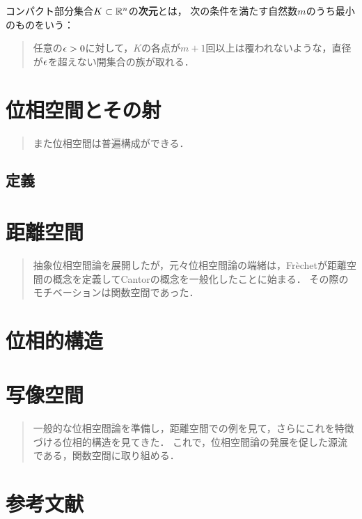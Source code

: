 \documentclass[uplatex,dvipdfmx]{jsreport}
\begin{document}
\begin{definition}
    コンパクト部分集合$K\subset\mathbb{R}^n$の\textbf{次元}とは，
    次の条件を満たす自然数$m$のうち最小のものをいう：
    \begin{quote}
        任意の$\epsilon>0$に対して，$K$の各点が$m+1$回以上は覆われないような，直径が$\epsilon$を超えない開集合の族が取れる．
    \end{quote}
\end{definition}

\chapter{位相空間とその射}

\begin{quotation}
    また位相空間は普遍構成ができる．
\end{quotation}

\section{定義}

\chapter{距離空間}

\begin{quotation}
    抽象位相空間論を展開したが，元々位相空間論の端緒は，Fr\`{e}chetが距離空間の概念を定義してCantorの概念を一般化したことに始まる．
    その際のモチベーションは関数空間であった．
\end{quotation}

\chapter{位相的構造}

\chapter{写像空間}

\begin{quotation}
    一般的な位相空間論を準備し，距離空間での例を見て，さらにこれを特徴づける位相的構造を見てきた．
    これで，位相空間論の発展を促した源流である，関数空間に取り組める．
\end{quotation}

\chapter{参考文献}
\end{document}
